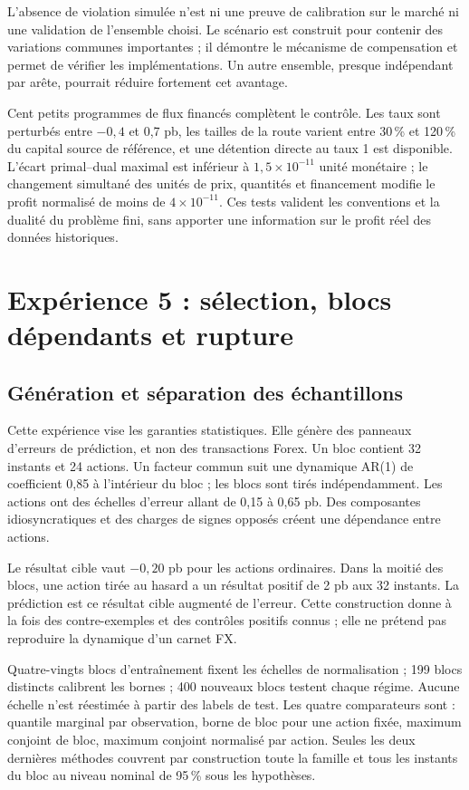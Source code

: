 L'absence de violation simulée n'est ni une preuve de calibration sur le marché ni une validation de l'ensemble choisi. Le scénario est construit pour contenir des variations communes importantes ; il démontre le mécanisme de compensation et permet de vérifier les implémentations. Un autre ensemble, presque indépendant par arête, pourrait réduire fortement cet avantage.

Cent petits programmes de flux financés complètent le contrôle. Les taux sont perturbés entre \(-0{,}4\) et 0,7 pb, les tailles de la route varient entre 30\,\% et 120\,\% du capital source de référence, et une détention directe au taux 1 est disponible. L'écart primal--dual maximal est inférieur à \(1{,}5\times10^{-11}\) unité monétaire ; le changement simultané des unités de prix, quantités et financement modifie le profit normalisé de moins de \(4\times10^{-11}\). Ces tests valident les conventions et la dualité du problème fini, sans apporter une information sur le profit réel des données historiques.

\clearpage
\section{Expérience 5 : sélection, blocs dépendants et rupture}
\label{sec:ext-exp-five}

\subsection{Génération et séparation des échantillons}

Cette expérience vise les garanties statistiques. Elle génère des panneaux d'erreurs de prédiction, et non des transactions Forex. Un bloc contient 32 instants et 24 actions. Un facteur commun suit une dynamique AR(1) de coefficient 0,85 à l'intérieur du bloc ; les blocs sont tirés indépendamment. Les actions ont des échelles d'erreur allant de 0,15 à 0,65 pb. Des composantes idiosyncratiques et des charges de signes opposés créent une dépendance entre actions.

Le résultat cible vaut \(-0{,}20\) pb pour les actions ordinaires. Dans la moitié des blocs, une action tirée au hasard a un résultat positif de 2 pb aux 32 instants. La prédiction est ce résultat cible augmenté de l'erreur. Cette construction donne à la fois des contre-exemples et des contrôles positifs connus ; elle ne prétend pas reproduire la dynamique d'un carnet FX.

Quatre-vingts blocs d'entraînement fixent les échelles de normalisation ; 199 blocs distincts calibrent les bornes ; 400 nouveaux blocs testent chaque régime. Aucune échelle n'est réestimée à partir des labels de test. Les quatre comparateurs sont : quantile marginal par observation, borne de bloc pour une action fixée, maximum conjoint de bloc, maximum conjoint normalisé par action. Seules les deux dernières méthodes couvrent par construction toute la famille et tous les instants du bloc au niveau nominal de 95\,\% sous les hypothèses.

